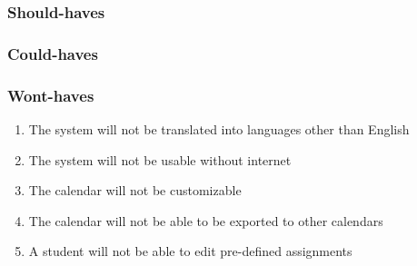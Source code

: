 \subsubsection{Should-haves}

\subsubsection{Could-haves}

\subsubsection{Wont-haves}

\begin{enumerate}
  \item The system will not be translated into languages other than English

  \item The system will not be usable without internet

  \item The calendar will not be customizable

  \item The calendar will not be able to be exported to other calendars

  \item A student will not be able to edit pre-defined assignments
\end{enumerate}


